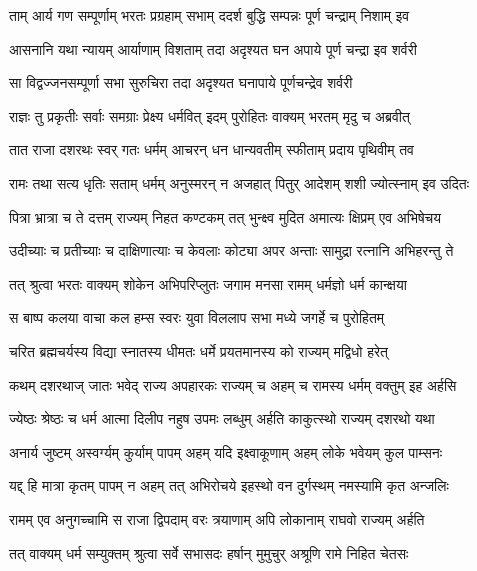 
\twolineshloka
{ताम् आर्य गण सम्पूर्णाम् भरतः प्रग्रहाम् सभाम्}
{ददर्श बुद्धि सम्पन्नः पूर्ण चन्द्राम् निशाम् इव} %

\twolineshloka
{आसनानि यथा न्यायम् आर्याणाम् विशताम् तदा}
{अदृश्यत घन अपाये पूर्ण चन्द्रा इव शर्वरी} %

\twolineshloka
{सा विद्वज्जनसम्पूर्णा सभा सुरुचिरा तदा}
{अदृश्यत घनापाये पूर्णचन्द्रेव शर्वरी} %

\twolineshloka
{राज्ञः तु प्रकृतीः सर्वाः समग्राः प्रेक्ष्य धर्मवित्}
{इदम् पुरोहितः वाक्यम् भरतम् मृदु च अब्रवीत्} %

\twolineshloka
{तात राजा दशरथः स्वर् गतः धर्मम् आचरन्}
{धन धान्यवतीम् स्फीताम् प्रदाय पृथिवीम् तव} %

\twolineshloka
{रामः तथा सत्य धृतिः सताम् धर्मम् अनुस्मरन्}
{न अजहात् पितुर् आदेशम् शशी ज्योत्स्नाम् इव उदितः} %

\twolineshloka
{पित्रा भ्रात्रा च ते दत्तम् राज्यम् निहत कण्टकम्}
{तत् भुन्क्ष्व मुदित अमात्यः क्षिप्रम् एव अभिषेचय} %

\twolineshloka
{उदीच्याः च प्रतीच्याः च दाक्षिणात्याः च केवलाः}
{कोट्या अपर अन्ताः सामुद्रा रत्नानि अभिहरन्तु ते} %

\twolineshloka
{तत् श्रुत्वा भरतः वाक्यम् शोकेन अभिपरिप्लुतः}
{जगाम मनसा रामम् धर्मज्ञो धर्म कान्क्षया} %

\twolineshloka
{स बाष्प कलया वाचा कल हम्स स्वरः युवा}
{विललाप सभा मध्ये जगर्हे च पुरोहितम्} %

\twolineshloka
{चरित ब्रह्मचर्यस्य विद्या स्नातस्य धीमतः}
{धर्मे प्रयतमानस्य को राज्यम् मद्विधो हरेत्} %

\twolineshloka
{कथम् दशरथाज् जातः भवेद् राज्य अपहारकः}
{राज्यम् च अहम् च रामस्य धर्मम् वक्तुम् इह अर्हसि} %

\twolineshloka
{ज्येष्ठः श्रेष्ठः च धर्म आत्मा दिलीप नहुष उपमः}
{लब्धुम् अर्हति काकुत्स्थो राज्यम् दशरथो यथा} %

\twolineshloka
{अनार्य जुष्टम् अस्वर्ग्यम् कुर्याम् पापम् अहम् यदि}
{इक्ष्वाकूणाम् अहम् लोके भवेयम् कुल पाम्सनः} %

\twolineshloka
{यद्द् हि मात्रा कृतम् पापम् न अहम् तत् अभिरोचये}
{इहस्थो वन दुर्गस्थम् नमस्यामि कृत अन्जलिः} %

\twolineshloka
{रामम् एव अनुगच्चामि स राजा द्विपदाम् वरः}
{त्रयाणाम् अपि लोकानाम् राघवो राज्यम् अर्हति} %

\twolineshloka
{तत् वाक्यम् धर्म सम्युक्तम् श्रुत्वा सर्वे सभासदः}
{हर्षान् मुमुचुर् अश्रूणि रामे निहित चेतसः} %

